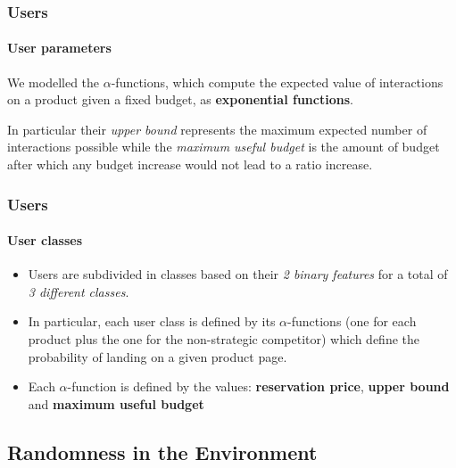 \documentclass[11pt]{beamer}
\begin{document}

\begin{frame}

\frametitle{Users}
\framesubtitle{User parameters}

We modelled the $\alpha$-functions, which compute the expected value of interactions on a product given a fixed budget, as \textbf{exponential functions}.

In particular their \textit{upper bound} represents the maximum expected number of interactions possible while the \textit{maximum useful budget} is the amount of budget after which any budget increase would not lead to a ratio increase.

\end{frame}


\begin{frame}

\frametitle{Users}
\framesubtitle{User classes}

\begin{itemize}[leftmargin=*, label={$\circ$}]
    \item Users are subdivided in classes based on their \textit{2 binary features} for a total of \textit{3 different classes}.
    \item In particular, each user class is defined by its $\alpha$-functions (one for each product plus the one for the non-strategic competitor) which define the probability of landing on a given product page.
    \item Each $\alpha$-function is defined by the values: \textbf{reservation price}, \textbf{upper bound} and \textbf{maximum useful budget}
\end{itemize}

\end{frame}


\subsection{Randomness in the Environment}

\end{document}

